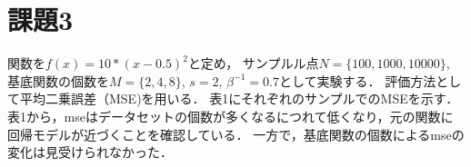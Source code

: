\documentclass[twocolumn]{jarticle}
\begin{document}
\section{課題3}
関数を$f(x) =  10 * (x - 0.5)^2$と定め，
サンプルル点$N = \{100,1000,10000\}$, 基底関数の個数を$M = \{2, 4, 8\}$, $s = 2$, $\beta^{-1} = 0.7$として実験する．
評価方法として平均二乗誤差（MSE)を用いる．
表1にそれぞれのサンプルでのMSEを示す．
表1から，mseはデータセットの個数が多くなるにつれて低くなり，元の関数に回帰モデルが近づくことを確認している．
一方で，基底関数の個数によるmseの変化は見受けられなかった．





\end{document}
